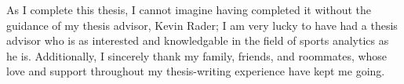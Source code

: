 
As I complete this thesis, I cannot imagine having completed it without the guidance
of my thesis advisor, Kevin Rader; I am very lucky to have had a thesis advisor who
is as interested and knowledgable in the field of sports analytics as he is.
Additionally, I sincerely thank my family, friends, and roommates, whose love and
support throughout my thesis-writing experience have kept me going.
